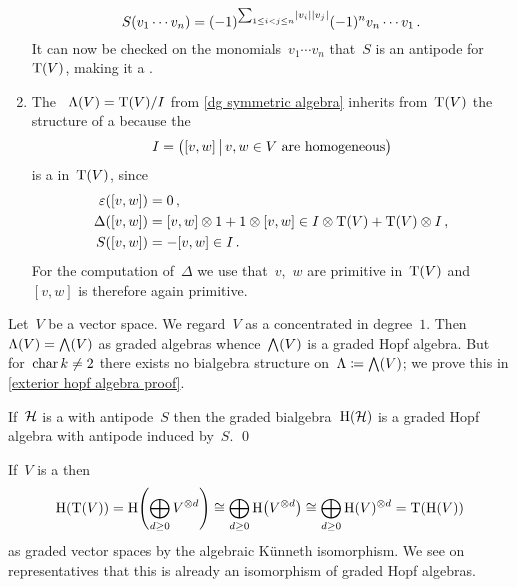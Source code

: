 \documentclass[a4paper,10pt,headings=standardclasses]{scrartcl}
\begin{document}
\begin{example}
\begin{enumerate}
      \[
        S(v_1 \dotsm v_n)
        =
        (-1)^{\sum_{1 \leq i < j \leq n} \lvert v_i\rvert \lvert v_j\rvert}
        (-1)^n
        v_n \dotsm v_1  \,.
      \]%
      It can now be checked on the monomials~$v_1 \dotsm v_n$ that~$S$ is an antipode for~$\operatorname{T}(V)$, making it a {\dgh}.
    \item
      The {\dga}~$\operatorname{\Lambda}(V) = \operatorname{T}(V)/I$ from \cref{dg symmetric algebra} inherits from~$\operatorname{T}(V)$ the structure of a {\dgh} because the~{\dgi}
      \[
        I
        =
        \bigl(
          [v,w]
        \suchthat[\big]
          \text{$v,w \in V$ are homogeneous}
        \bigr)
      \]
      is a {\dghi} in~$\operatorname{T}(V)$, since
      \begin{align*}
        \varepsilon([v,w])
        &=
        0 \,,
      \\
        \Delta([v,w])
        &=
        [v,w] \otimes 1 + 1 \otimes [v,w]
        \in
        I \otimes \operatorname{T}(V) + \operatorname{T}(V) \otimes I \,,
      \\
        S([v,w])
        &=
        -[v,w]
        \in
        I \,.
      \end{align*}
      For the computation of~$\Delta$ we use that~$v$,~$w$ are primitive in~$\operatorname{T}(V)$ and~$[v,w]$ is therefore again primitive.
  \end{enumerate}
\end{example}

\begin{example}
  \label{exterior hopf algebra}
  Let~$V$ be a vector space.
  We regard~$V$ as a {\dgv} concentrated in degree~$1$.
  Then~$\operatorname{\Lambda}(V) = \bigwedge(V)$ as graded algebras whence~$\bigwedge(V)$ is a graded Hopf algebra.
  But for~$\operatorname{char} k \neq 2$ there exists no bialgebra structure on~$\Lambda \coloneqq \bigwedge(V)$;
  we prove this in \cref{exterior hopf algebra proof}.
\end{example}

\begin{proposition}
  If~$\mathcal{H}$ is a {\dgh} with antipode~$S$ then the graded bialgebra~$\operatorname{H}(\mathcal{H})$ is a graded Hopf algebra with antipode induced by~$S$.
  \qed
\end{proposition}

\begin{example}
  If~$V$ is a {\dgv} then
  \[
    \operatorname{H}(\operatorname{T}(V))
    =
    \operatorname{H}\Biggl( \bigoplus_{d \geq 0} V^{\otimes d} \Biggr)
    \cong
    \bigoplus_{d \geq 0} \operatorname{H}\bigl( V^{\otimes d} \bigr)
    \cong
    \bigoplus_{d \geq 0} \operatorname{H}(V)^{\otimes d}
    =
    \operatorname{T}(\operatorname{H}(V))
  \]
  as graded vector spaces by the algebraic Künneth isomorphism.
  We see on representatives that this is already an isomorphism of graded Hopf algebras.
\end{example}
\end{document}

